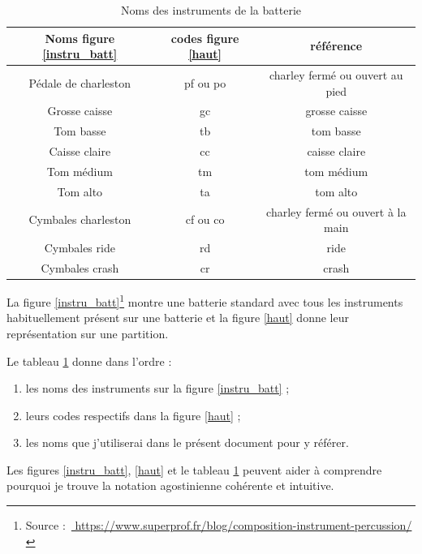 \begin{table}[h]
\centering
\begin{tabular}{|c|c|c|} \hline
Noms figure \ref{instru_batt} & codes figure \ref{haut}  & référence \\ \hline
Pédale de charleston & pf ou po & charley fermé ou ouvert au pied \\
Grosse caisse & gc & grosse caisse \\
Tom basse & tb & tom basse \\
Caisse claire & cc & caisse claire \\
Tom médium & tm & tom médium \\
Tom alto & ta & tom alto \\
Cymbales charleston & cf ou co & charley fermé ou ouvert à la main \\
Cymbales ride & rd & ride \\
Cymbales crash & cr & crash \\ \hline
	\end{tabular}
	\caption{Noms des instruments de la batterie}
	\label{nom_instru_batt}
\end{table}
La figure \ref{instru_batt}\footnote{Source : \url{
https://www.superprof.fr/blog/composition-instrument-percussion/}} montre une
batterie standard avec tous les instruments habituellement présent sur une
batterie et la figure \ref{haut} donne leur représentation sur une partition.

Le tableau \ref{nom_instru_batt} donne dans l’ordre :
\begin{enumerate}
    \item les noms des instruments sur la figure \ref{instru_batt} ;
    \item leurs codes respectifs dans la figure \ref{haut} ;
    \item les noms que j’utiliserai dans le présent document pour y référer.
\end{enumerate}
Les figures \ref{instru_batt}, \ref{haut} et le tableau \ref{nom_instru_batt}
peuvent aider à comprendre pourquoi je trouve la notation agostinienne
cohérente et intuitive.

